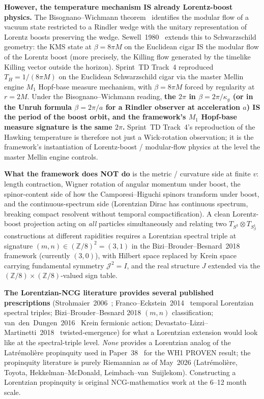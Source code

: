 \documentclass[11pt]{article}
\begin{document}
\begin{enumerate}
\textbf{However, the temperature mechanism IS already
Lorentz-boost physics.}  The Bisognano--Wichmann theorem~\cite{bisognano_wichmann1976}
identifies the modular flow of a vacuum state restricted to a
Rindler wedge with the unitary representation of Lorentz boosts
preserving the wedge.  Sewell~1980~\cite{sewell1980} extends this
to Schwarzschild geometry: the KMS state at $\beta = 8\pi M$ on the
Euclidean cigar IS the modular flow of the Lorentz boost (more
precisely, the Killing flow generated by the timelike Killing
vector outside the horizon).  Sprint~TD Track~4 reproduced
$T_H = 1/(8\pi M)$ on the Euclidean Schwarzschild cigar via the
master Mellin engine $M_1$ Hopf-base measure mechanism, with
$\beta = 8\pi M$ forced by regularity at $r = 2M$.  Under the
Bisognano--Wichmann reading, \textbf{the $2\pi$ in $\beta = 2\pi/\kappa_g$
(or in the Unruh formula $\beta = 2\pi/a$ for a Rindler observer at
acceleration $a$) IS the period of the boost orbit, and the
framework's $M_1$ Hopf-base measure signature is the same $2\pi$.}
Sprint~TD Track~4's reproduction of the Hawking temperature is
therefore not just a Wick-rotation observation; it is the
framework's instantiation of Lorentz-boost / modular-flow physics
at the level the master Mellin engine controls.

\textbf{What the framework does NOT do} is the metric / curvature
side at finite $v$: length contraction, Wigner rotation of angular
momentum under boost, the spinor-content side of how the
Camporesi--Higuchi spinors transform under boost, and the
continuous-spectrum side (Lorentzian Dirac has continuous spectrum,
breaking compact resolvent without temporal compactification).  A
clean Lorentz-boost projection acting on \emph{all} particles
simultaneously and relating two $T_{S^3} \otimes T_{S^1_\beta}$
constructions at different rapidities requires a Lorentzian
spectral triple at signature $(m, n) \in (\mathbb{Z}/8)^2 = (3, 1)$
in the Bizi--Brouder--Besnard~2018~\cite{bizi_brouder_besnard2018}
framework (currently $(3, 0)$), with Hilbert space replaced by Krein
space carrying fundamental symmetry $\mathcal{J}^2 = I$, and the
real structure $J$ extended via the
$(\mathbb{Z}/8) \times (\mathbb{Z}/8)$-valued sign table.

\textbf{The Lorentzian-NCG literature provides several published
prescriptions} (Strohmaier~2006~\cite{strohmaier2006};
Franco--Eckstein~2014~\cite{franco_eckstein2014} temporal Lorentzian
spectral triples; Bizi--Brouder--Besnard 2018 $(m,n)$
classification; van~den~Dungen~2016~\cite{van_den_dungen2016} Krein
fermionic action; Devastato--Lizzi--Martinetti~2018~\cite{devastato_lizzi_martinetti2018}
twisted-emergence) for what a Lorentzian extension would look like
at the spectral-triple level.  \emph{None} provides a Lorentzian
analog of the Latr\'emoli\`ere propinquity used in
Paper~38~\cite{paper38} for the WH1 PROVEN result; the propinquity
literature is purely Riemannian as of May~2026 (Latr\'emoli\`ere,
Toyota, Hekkelman--McDonald, Leimbach--van~Suijlekom).
Constructing a Lorentzian propinquity is original NCG-mathematics
work at the 6--12 month scale.


\end{enumerate}
\end{document}
